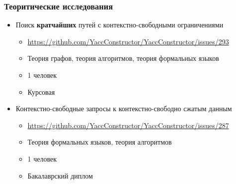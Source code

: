 \documentclass{beamer}
\begin{document}
\begin{frame}[fragile]
\transwipe[direction=90]
\frametitle{Теоритические исследования}
  \begin{itemize}
    \item Поиск \textbf{кратчайших} путей с контекстно-свободными ограничениями
    \begin{itemize}
       \item \footnotesize{\url{https://github.com/YaccConstructor/YaccConstructor/issues/293}}
       \item Теория графов, теория алгоритмов, теория формальных языков 
       \item 1 человек 
       \item Курсовая
    \end{itemize}
    \item Контекстно-свободные запросы к контекстно-свободно сжатым данным
    \begin{itemize}
       \item \footnotesize{\url{https://github.com/YaccConstructor/YaccConstructor/issues/287}}
       \item Теория формальных языков, теория алгоритмов 
       \item 1 человек
       \item Бакалаврский диплом
    \end{itemize}
  \end{itemize}  
\end{frame}
\end{document}
